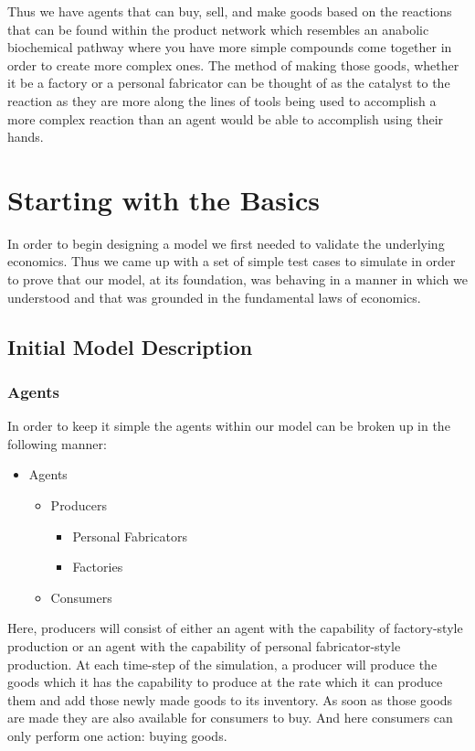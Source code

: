 \documentclass[11pt,letterpaper]{article}
\begin{document}
Thus we have agents that can buy, sell, and make goods based on the reactions that can be found within the product network which resembles an anabolic biochemical pathway where you have more simple compounds come together in order to  create more complex ones.  The method of making those goods, whether it be a factory or a personal fabricator can be thought of as the catalyst to the reaction as they are more along the lines of tools being used to accomplish a more complex reaction than an agent would be able to accomplish using their hands.

\section*{Starting with the Basics}

In order to begin designing a model we first needed to validate the underlying economics. Thus we came up with a set of simple test cases to simulate in order to prove that our model, at its foundation, was behaving in a manner in which we understood and that was grounded in the fundamental laws of economics.

\subsection*{Initial Model Description}

\subsubsection*{Agents}

In order to keep it simple the agents within our model can be broken up in the following manner:

\begin{itemize}
\item
Agents
\begin{itemize}
\item
Producers
\begin{itemize}
\item
Personal Fabricators
\item
Factories
\end{itemize}
\item
Consumers
\end{itemize}
\end{itemize}

Here, producers will consist of either an agent with the capability  of factory-style production or an agent with the capability of personal fabricator-style production. At each time-step of the simulation, a producer will produce the goods which it has the capability to produce at the rate which it can produce them and add those newly made goods to its inventory. As soon as those goods are made they are also available for consumers to buy. And here consumers can only perform one action: buying goods.
\end{document}
